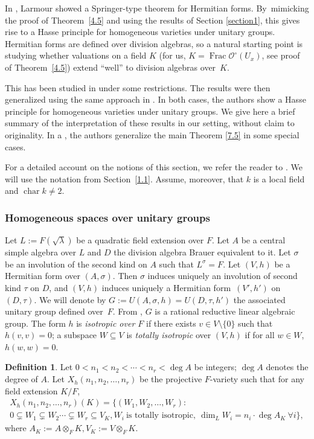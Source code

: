 \documentclass[JEP,XML,SOM,Unicode,NoFloatCountersInSection,published]{cedram}
\DeclareMathOperator{\Char}{char}
\DeclareMathOperator{\Frac}{Frac}
\let\backslash\setminus
\theoremstyle{definition}
\newtheorem{defn}[thm]{Definition}
\begin{document}
In \cite{larmour}, Larmour showed a Springer-type theorem for Hermitian forms. By~mimicking the proof of Theorem~\ref{4.5} and using the results of Section \ref{section1}, this gives rise to a Hasse principle for homogeneous varieties under unitary groups. Hermitian forms are defined over division algebras, so a natural starting point is studying whether valuations on a field $K$ (for us, $K=\Frac \mathcal{O}^{\circ}(U_x)$, see proof of Theorem~\ref{4.5}) extend ``well'' to division algebras over~$K$.

This has been studied in \cite{wu} under some restrictions. The results were then generalized using the same approach in \cite{parsur}. In both cases, the authors show a Hasse principle for homogeneous varieties under unitary groups. We give here a brief summary of the interpretation of these results in our setting, without claim to originality. In a \cite{guhsur}, the authors generalize the main Theorem \ref{7.5} in some special cases.

For a detailed account on the notions of this section, we refer the reader to \cite{involutions}. We will use the notation from Section~\ref{1.1}. Assume, moreover, that $k$ is a local field and ${\Char k \neq 2}$.

\subsubsection{Homogeneous spaces over unitary groups} \label{subsection7.1}

Let $L:=F(\sqrt{\lambda})$ be a quadratic field extension over $F$. Let $A$ be a central simple algebra over $L$ and $D$ the division algebra Brauer equivalent to it. Let $\sigma$ be an involution of the second kind on $A$ such that $L^{\sigma}=F$. Let $(V,h)$ be a Hermitian form over $(A, \sigma)$. Then $\sigma$ induces uniquely an involution of second kind $\tau$ on $D$, and $(V,h)$ induces uniquely a Hermitian form~$(V', h')$ on~$(D, \tau)$. We will denote by $G:=\textit{U}(A, \sigma, h)=\textit{U}(D, \tau, h')$ the associated unitary group defined over~$F$. From \cite[Prop.\,2.4]{merkchern}, $G$ is a rational reductive linear algebraic group. The form $h$ is \emph{isotropic over $F$} if there exists $v \in V \backslash \{0\}$ such that $h(v,v)=0$; a subspace $W \subseteq V$ is \emph{totally isotropic} over $(V,h)$ if for all $w \in W$, $h(w,w)=0$.

\begin{defn} \label{7.2} Let $0<n_1 < n_2< \cdots < n_r < \deg{A}$ be integers; $\deg{A}$ denotes the degree of $A$. Let $X_h(n_1, n_2, \dots, n_r)$ be the projective $F$-variety such that for any field extension $K/F$,\vspace*{-8pt}
\begin{multline*}
X_h(n_1, n_2, \dots, n_r)(K)=\{(W_1, W_2, \dots, W_r) :\\
0 \subsetneq W_1 \subsetneq W_2 \cdots \subsetneq W_r \subseteq V_K, W_i \ \text{is totally isotropic}, \ \dim_L{W_i}=n_i\cdot \deg{A_K} \ \forall i\},
\end{multline*}
where $A_K:=A \otimes_F K, V_K:=V \otimes_{F} K$.
\end{defn}
\end{document}

